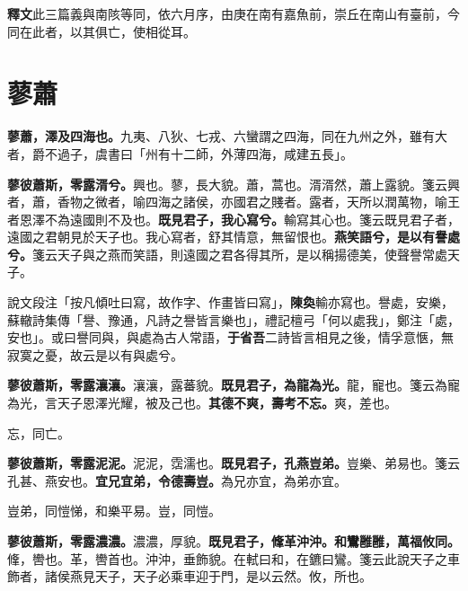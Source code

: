 \begin{quoting}\textbf{釋文}此三篇義與南陔等同，依六月序，由庚在南有嘉魚前，崇丘在南山有臺前，今同在此者，以其俱亡，使相從耳。\end{quoting}

\section{蓼蕭}


\textbf{蓼蕭，澤及四海也。}{\footnotesize 九夷、八狄、七戎、六蠻謂之四海，同在九州之外，雖有大者，爵不過子，虞書曰「州有十二師，外薄四海，咸建五長」。}

\textbf{蓼彼蕭斯，零露湑兮。}{\footnotesize 興也。蓼，長大貌。蕭，蒿也。湑湑然，蕭上露貌。箋云興者，蕭，香物之微者，喻四海之諸侯，亦國君之賤者。露者，天所以潤萬物，喻王者恩澤不為遠國則不及也。}\textbf{既見君子，我心寫兮。}{\footnotesize 輸寫其心也。箋云既見君子者，遠國之君朝見於天子也。我心寫者，舒其情意，無留恨也。}\textbf{燕笑語兮，是以有譽處兮。}{\footnotesize 箋云天子與之燕而笑語，則遠國之君各得其所，是以稱揚德美，使聲譽常處天子。}

\begin{quoting}說文段注「按凡傾吐曰寫，故作字、作畫皆曰寫」，\textbf{陳奐}輸亦寫也。譽處，安樂，蘇轍詩集傳「譽、豫通，凡詩之譽皆言樂也」，禮記檀弓「何以處我」，鄭注「處，安也」。或曰譽同與，與處為古人常語，\textbf{于省吾}二詩皆言相見之後，情孚意愜，無寂寞之憂，故云是以有與處兮。\end{quoting}

\textbf{蓼彼蕭斯，零露瀼瀼。}{\footnotesize 瀼瀼，露蕃貌。}\textbf{既見君子，為龍為光。}{\footnotesize 龍，寵也。箋云為寵為光，言天子恩澤光耀，被及己也。}\textbf{其德不爽，壽考不忘。}{\footnotesize 爽，差也。}

\begin{quoting}忘，同亡。\end{quoting}

\textbf{蓼彼蕭斯，零露泥泥。}{\footnotesize 泥泥，霑濡也。}\textbf{既見君子，孔燕豈弟。}{\footnotesize 豈樂、弟易也。箋云孔甚、燕安也。}\textbf{宜兄宜弟，令德壽豈。}{\footnotesize 為兄亦宜，為弟亦宜。}

\begin{quoting}豈弟，同愷悌，和樂平易。豈，同愷。\end{quoting}

\textbf{蓼彼蕭斯，零露濃濃。}{\footnotesize 濃濃，厚貌。}\textbf{既見君子，鞗革沖沖。和鸞雝雝，萬福攸同。}{\footnotesize 鞗，轡也。革，轡首也。沖沖，垂飾貌。在軾曰和，在鑣曰鸞。箋云此說天子之車飾者，諸侯燕見天子，天子必乘車迎于門，是以云然。攸，所也。}

